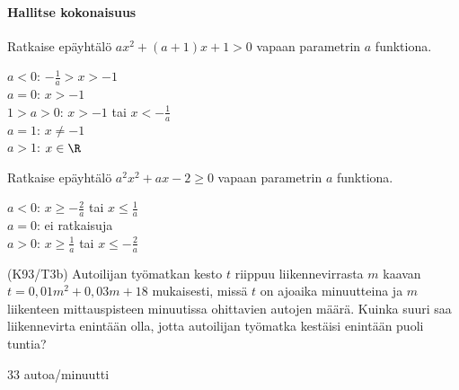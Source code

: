 \begin{tehtavasivu}
\begin{tehtava}
  \begin{vastaus}
    \begin{alakohdat}
    \end{alakohdat}
  \end{vastaus}
\end{tehtava}

\paragraph*{Hallitse kokonaisuus}

\begin{tehtava}
    Ratkaise epäyhtälö $ax^2+(a+1)x+1 > 0$ vapaan parametrin $a$ funktiona.
    \begin{vastaus}
        $a < 0$: $-\frac{1}{a} > x > -1$ \\ $a = 0$: $x > -1$ \\ $1 > a > 0$: $x > -1$ tai $x < -\frac{1}{a}$ \\ $a = 1$: $x \neq -1$ \\ $a > 1$: $x \in \R$
    \end{vastaus}
\end{tehtava}

\begin{tehtava}
    Ratkaise epäyhtälö $a^2x^2+ax-2 \geq 0$ vapaan parametrin $a$ funktiona.
    \begin{vastaus}
        $a < 0$: $x \geq -\frac{2}{a}$ tai $x \leq \frac{1}{a}$ \\ $a = 0$: ei ratkaisuja \\ $a > 0$: $x \geq \frac{1}{a}$ tai $x \leq -\frac{2}{a}$
    \end{vastaus}
\end{tehtava}


\begin{tehtava}
(K93/T3b) Autoilijan työmatkan kesto $t$ riippuu liikennevirrasta $m$ kaavan 
        $t=0,01m^2+0,03m+18$ mukaisesti, missä $t$ on ajoaika minuutteina ja $m$ liikenteen mittauspisteen minuutissa ohittavien autojen määrä. Kuinka suuri saa liikennevirta enintään olla, jotta autoilijan työmatka kestäisi enintään puoli tuntia?
\begin{vastaus}
        $33$ autoa/minuutti
    \end{vastaus}
\end{tehtava}


\end{tehtavasivu}
